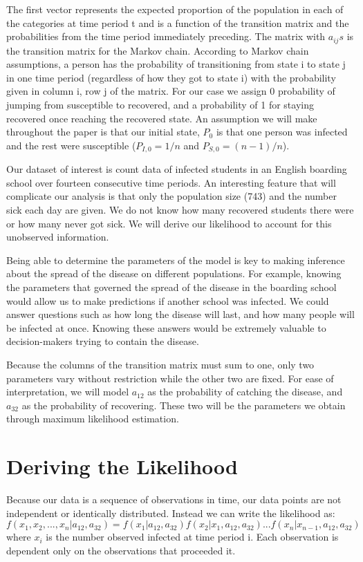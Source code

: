 \documentclass{svproc}
\begin{document}
The first vector represents the expected proportion of the population in each of the categories at time period t and is a function of the transition matrix and the probabilities from the time period immediately preceding. The matrix with $a_{ij}s$ is the transition matrix for the Markov chain. According to Markov chain assumptions, a person has the probability of transitioning from state i to state j in one time period (regardless of how they got to state i) with the probability given in column i, row j of the matrix. For our case we assign 0 probability of jumping from susceptible to recovered, and a probability of 1 for staying recovered once reaching the recovered state. An assumption we will make throughout the paper is that our initial state, $P_0$ is that one person was infected and the rest were susceptible ($P_{I,0}=1/n$ and $P_{S, 0} = (n-1)/n$).

Our dataset of interest is count data of infected students in an English boarding school over fourteen consecutive time periods. An interesting feature that will complicate our analysis is that only the population size (743) and the number sick each day are given. We do not know how many recovered students there were or how many never got sick. We will derive our likelihood to account for this unobserved information. 

Being able to determine the parameters of the model is key to making inference about the spread of the disease on different populations. For example, knowing the parameters that governed the spread of the disease in the boarding school would allow us to make predictions if another school was infected. We could answer questions such as how long the disease will last, and how many people will be infected at once. Knowing these answers would be extremely  valuable to decision-makers trying to contain the disease.

Because the columns of the transition matrix must sum to one, only two parameters vary without restriction while the other two are fixed. For ease of interpretation, we will model $a_{12}$ as the probability of catching the disease, and $a_{32}$ as the probability of recovering. These two will be the parameters we obtain through maximum likelihood estimation. 

\section{Deriving the Likelihood}
Because our data is a sequence of observations in time, our data points are not independent or identically distributed. Instead we can write the likelihood as:
\begin{equation}
f(x_1, x_2,...,x_n| a_{12}, a_{32}) = f(x_1| a_{12}, a_{32}) f(x_2|x_1, a_{12}, a_{32}) ... f(x_n|x_{n-1}, a_{12}, a_{32})
\end{equation}
where $x_i$ is the number observed infected at time period i. Each observation is dependent only on the observations that proceeded it.
\end{document}

